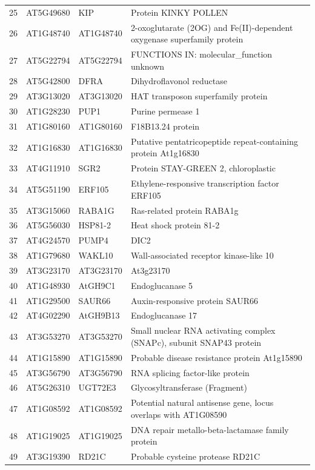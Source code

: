\documentclass[11pt]{article}
\begin{document}
\begin{center}
\begin{tabular}{rlll}
25 & AT5G49680 & KIP & Protein KINKY POLLEN\\
26 & AT1G48740 & AT1G48740 & 2-oxoglutarate (2OG) and Fe(II)-dependent oxygenase superfamily protein\\
27 & AT5G22794 & AT5G22794 & FUNCTIONS IN: molecular\_function unknown\\
28 & AT5G42800 & DFRA & Dihydroflavonol reductase\\
29 & AT3G13020 & AT3G13020 & HAT transposon superfamily protein\\
30 & AT1G28230 & PUP1 & Purine permease 1\\
31 & AT1G80160 & AT1G80160 & F18B13.24 protein\\
32 & AT1G16830 & AT1G16830 & Putative pentatricopeptide repeat-containing protein At1g16830\\
33 & AT4G11910 & SGR2 & Protein STAY-GREEN 2, chloroplastic\\
34 & AT5G51190 & ERF105 & Ethylene-responsive transcription factor ERF105\\
35 & AT3G15060 & RABA1G & Ras-related protein RABA1g\\
36 & AT5G56030 & HSP81-2 & Heat shock protein 81-2\\
37 & AT4G24570 & PUMP4 & DIC2\\
38 & AT1G79680 & WAKL10 & Wall-associated receptor kinase-like 10\\
39 & AT3G23170 & AT3G23170 & At3g23170\\
40 & AT1G48930 & AtGH9C1 & Endoglucanase 5\\
41 & AT1G29500 & SAUR66 & Auxin-responsive protein SAUR66\\
42 & AT4G02290 & AtGH9B13 & Endoglucanase 17\\
43 & AT3G53270 & AT3G53270 & Small nuclear RNA activating complex (SNAPc), subunit SNAP43 protein\\
44 & AT1G15890 & AT1G15890 & Probable disease resistance protein At1g15890\\
45 & AT3G56790 & AT3G56790 & RNA splicing factor-like protein\\
46 & AT5G26310 & UGT72E3 & Glycosyltransferase (Fragment)\\
47 & AT1G08592 & AT1G08592 & Potential natural antisense gene, locus overlaps with AT1G08590\\
48 & AT1G19025 & AT1G19025 & DNA repair metallo-beta-lactamase family protein\\
49 & AT3G19390 & RD21C & Probable cysteine protease RD21C\\

\end{tabular}
\end{center}
\end{document}
